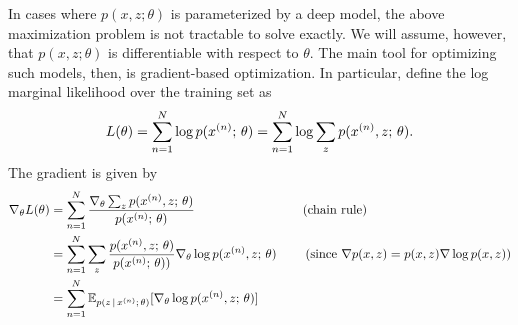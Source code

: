 \documentclass{article}
\begin{document}
In cases where $p(x, z ;\theta)$ is parameterized by a deep model, the above maximization problem
is not tractable to solve exactly. We will assume, however, that $ p(x, z ; \theta)$  is differentiable with respect to $\theta$. The main tool for optimizing such models, then, is gradient-based optimization. 
In particular, define the log marginal likelihood over the training set  as
\[ L(\theta) = \sum_{n=1}^N \log p(x^{(n)} ; \, \theta) = \sum_{n=1}^N \log \sum_{z }p(x^{(n)}, z ; \, \theta).\]
The gradient is given by
\begin{align*}
\nabla_\theta L(\theta) &= \sum_{n=1}^N \frac{\nabla_\theta  \sum_{z} p(x^{(n)}, z\param \theta)}{p(x^{(n)} \param \theta)} \hspace{30mm} \text{(chain rule)}\\
&=\sum_{n=1}^N \sum_z \frac{ p(x^{(n)}, z \param \theta)}{p(x^{(n)} \param \theta))}\nabla_\theta \log p(x^{(n)}, z \param \theta)  \hspace{8mm} \text{(since $\nabla p(x,z) = p(x,z)\nabla \log p(x,z))$}\\
&= \sum_{n=1}^N \E_{p(z \given x^{(n)} \param \theta)} [\nabla_{\theta} \log p(x^{(n)}, z \param \theta) ]
\end{align*}
\end{document}
